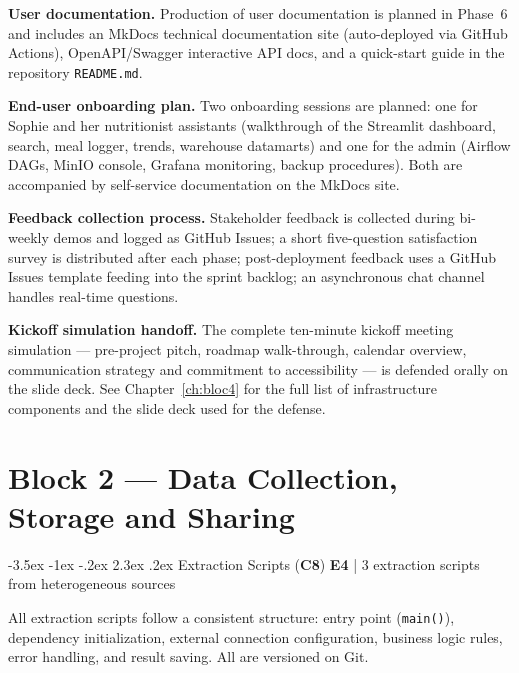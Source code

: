 \documentclass[a4paper,11pt,oneside,openany]{report}
\makeatletter
\renewcommand\section{\@startsection{section}{1}{\z@}%
  {-3.5ex \@plus -1ex \@minus -.2ex}%
  {2.3ex \@plus.2ex}%
  {\normalfont\Large\bfseries\color{ntgreen}}}
\newcommand{\competence}[1]{\textbf{\textcolor{ntgreen}{#1}}}
\newcommand{\evaluation}[1]{\textbf{\textcolor{ntblue}{#1}}}
\makeatother
\begin{document}
\textbf{User documentation.} Production of user documentation is
planned in Phase~6 and includes an MkDocs technical documentation
site (auto-deployed via GitHub Actions), OpenAPI/Swagger
interactive API docs, and a quick-start guide in the repository
\texttt{README.md}.

\textbf{End-user onboarding plan.} Two onboarding sessions are
planned: one for Sophie and her nutritionist assistants
(walkthrough of the Streamlit dashboard, search, meal logger,
trends, warehouse datamarts) and one for the admin (Airflow DAGs,
MinIO console, Grafana monitoring, backup procedures). Both are
accompanied by self-service documentation on the MkDocs site.

\textbf{Feedback collection process.} Stakeholder feedback is
collected during bi-weekly demos and logged as GitHub Issues; a
short five-question satisfaction survey is distributed after each
phase; post-deployment feedback uses a GitHub Issues template
feeding into the sprint backlog; an asynchronous chat channel
handles real-time questions.

\textbf{Kickoff simulation handoff.} The complete ten-minute
kickoff meeting simulation --- pre-project pitch, roadmap
walk-through, calendar overview, communication strategy and
commitment to accessibility --- is defended orally on the slide
deck. See Chapter~\ref{ch:bloc4} for the full list of
infrastructure components and the slide deck used for the
defense.


\chapter{Block 2 --- Data Collection, Storage and Sharing}
\label{ch:bloc2}

\section{Extraction Scripts (\competence{C8})}
\label{sec:c8}
{\small\evaluation{E4} | 3 extraction scripts from heterogeneous sources}

All extraction scripts follow a consistent structure: entry point
(\texttt{main()}), dependency initialization, external connection
configuration, business logic rules, error handling, and result saving.
All are versioned on Git.
\end{document}
